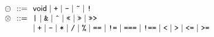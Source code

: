 \[
\begin{array}{l@{~~}r@{~~}ll}

 \preop & ::= & \SF{void} %
                \mid \TT{+} \mid \TT{-} \mid \TT{\~} \mid \TT{!} \\
 \inop & ::= & %
               \TT{|} \mid \TT{\&} 
               \mid \TT{\^} \mid \TT{<<} \mid \TT{>>} \mid \TT{>>>} \\
& & \mid \TT{+} \mid \TT{-} \mid \TT{*} \mid \TT{/} \mid \TT{\%} \mid \TT{==} \mid \TT{!=} 
               \mid \TT{===} \mid \TT{!==} \mid \TT{<} \mid \TT{>} \mid \TT{<=} \mid \TT{>=} \\

\end{array}
\]
